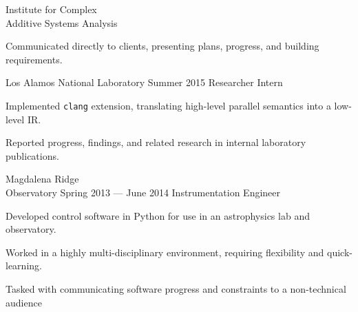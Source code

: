 \documentclass{tc_cv}
\begin{document}
\begin{minipage}[t]{0.6\linewidth}
\begin{job}{Institute for Complex \\ Additive Systems Analysis}
    \item Communicated directly to clients, presenting plans, progress, and
      building requirements.
  \end{job}
  \vspace{1em}
  \begin{job}{Los Alamos National Laboratory}
    {Summer 2015}
    {Researcher Intern}
    \item Implemented \texttt{clang} extension, translating high-level parallel
      semantics into a low-level IR.
    \item Reported progress, findings, and related research in internal
      laboratory publications.
  \end{job}
  \vspace{1em}
  \begin{job}{Magdalena Ridge \\ Observatory}
    {Spring 2013 --- June 2014}
    {Instrumentation Engineer}
    \item Developed control software in Python for use in an astrophysics lab
      and observatory.
    \item Worked in a highly multi-disciplinary environment, requiring
      flexibility and quick-learning.
    \item Tasked with communicating software progress and constraints to a
      non-technical audience
  \end{job}
  \vspace{1em}
\end{minipage}
\end{document}
